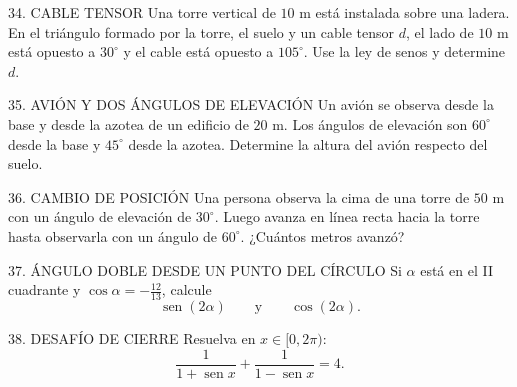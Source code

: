\documentclass[letterpaper,12pt]{article}
\newcommand{\seno}{\operatorname{sen}}
\begin{document}
\begin{desafiointegradorbox}{34. CABLE TENSOR}
Una torre vertical de \(10\) m está instalada sobre una ladera. En el triángulo formado por la torre, el suelo y un cable tensor \(d\), el lado de \(10\) m está opuesto a \(30^\circ\) y el cable está opuesto a \(105^\circ\). Use la ley de senos y determine \(d\).
\end{desafiointegradorbox}

\begin{desafiointegradorbox}{35. AVIÓN Y DOS ÁNGULOS DE ELEVACIÓN}
Un avión se observa desde la base y desde la azotea de un edificio de \(20\) m. Los ángulos de elevación son \(60^\circ\) desde la base y \(45^\circ\) desde la azotea. Determine la altura del avión respecto del suelo.
\end{desafiointegradorbox}

\begin{desafiointegradorbox}{36. CAMBIO DE POSICIÓN}
Una persona observa la cima de una torre de \(50\) m con un ángulo de elevación de \(30^\circ\). Luego avanza en línea recta hacia la torre hasta observarla con un ángulo de \(60^\circ\). ¿Cuántos metros avanzó?
\end{desafiointegradorbox}

\begin{desafiointegradorbox}{37. ÁNGULO DOBLE DESDE UN PUNTO DEL CÍRCULO}
Si \(\alpha\) está en el II cuadrante y \(\cos\alpha=-\frac{12}{13}\), calcule
\[
    \seno(2\alpha)
    \qquad\text{y}\qquad
    \cos(2\alpha).
\]
\end{desafiointegradorbox}

\begin{desafiointegradorbox}{38. DESAFÍO DE CIERRE}
Resuelva en \(x\in[0,2\pi)\):
\[
    \frac{1}{1+\seno x}+\frac{1}{1-\seno x}=4.
\]
\end{desafiointegradorbox}
\end{document}
